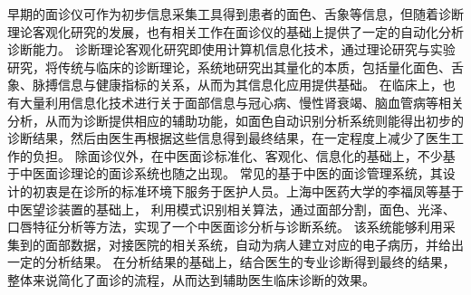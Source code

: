
早期的面诊仪可作为初步信息采集工具得到患者的面色、舌象等信息，但随着诊断理论客观化研究的发展，也有相关工作在面诊仪的基础上提供了一定的自动化分析诊断能力。
诊断理论客观化研究即使用计算机信息化技术，通过理论研究与实验研究，将传统与临床的诊断理论，系统地研究出其量化的本质，包括量化面色、舌象、脉搏信息与健康指标的关系\cite{Wang2013TCM, guo2015analysis, li2020tcminet}，从而为其信息化应用提供基础。
在临床上，也有大量利用信息化技术进行关于面部信息与冠心病、慢性肾衰竭、脑血管病等相关分析，从而为诊断提供相应的辅助功能，如面色自动识别分析系统\cite{崔骥2018人工智能背景下中医诊疗技术的应用与展望}则能得出初步的诊断结果，然后由医生再根据这些信息得到最终结果，在一定程度上减少了医生工作的负担。
除面诊仪外，在中医面诊标准化、客观化、信息化的基础上，不少基于中医面诊理论的面诊系统也随之出现。
常见的基于中医的面诊管理系统，其设计的初衷是在诊所的标准环境下服务于医护人员。上海中医药大学的李福凤等基于中医望诊装置\cite{李国正0一种用于中医望诊的三维图像采集装置}的基础上，
利用模式识别相关算法，通过面部分割，面色、光泽、口唇特征分析等方法，实现了一个中医面诊分析与诊断系统\cite{李福凤2016中医面诊分析与诊断系统}。
该系统能够利用采集到的面部数据，对接医院的相关系统，自动为病人建立对应的电子病历，并给出一定的分析结果。
在分析结果的基础上，结合医生的专业诊断得到最终的结果，整体来说简化了面诊的流程，从而达到辅助医生临床诊断的效果。

